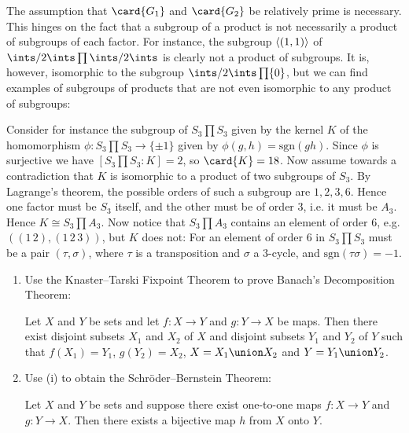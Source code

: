 \documentclass[article, a4paper, 11pt, oneside]{memoir}
\numberwithin{equation}{chapter}
\DeclarePairedDelimiter{\gen}{\langle}{\rangle} %
\renewenvironment{exerciseframed}[1][]{%
    \setsepchar{.}%
    \readlist*\mylist{#1}%
    \def\smalllabel{\mylist[2].\mylist[3]}%
    \refstepcounter{exerciseframed}%
    \begin{exerciseframed*}[#1]%
    \label{ex:#1}%
}{%
    \end{exerciseframed*}%
}
\theoremstyle{nonumberplain}
\newenvironment{displaytheorem}{%
	\begin{displayquote}\itshape%
}{%
	\end{displayquote}%
}
\begin{document}
\newcommand{\sgn}{\mathrm{sgn}}

\begin{remark}
    The assumption that $\card{G_1}$ and $\card{G_2}$ be relatively prime is necessary. This hinges on the fact that a subgroup of a product is not necessarily a product of subgroups of each factor. For instance, the subgroup $\gen{(1,1)}$ of $\ints/2\ints \prod \ints/2\ints$ is clearly not a product of subgroups. It is, however, isomorphic to the subgroup $\ints/2\ints \prod \{0\}$, but we can find examples of subgroups of products that are not even isomorphic to any product of subgroups:

    Consider for instance the subgroup of $S_3 \prod S_3$ given by the kernel $K$ of the homomorphism $\phi \colon S_3 \prod S_3 \to \{\pm 1\}$ given by $\phi(g,h) = \sgn(gh)$. Since $\phi$ is surjective we have $[S_3 \prod S_3 : K] = 2$, so $\card{K} = 18$. Now assume towards a contradiction that $K$ is isomorphic to a product of two subgroups of $S_3$. By Lagrange's theorem, the possible orders of such a subgroup are $1,2,3,6$. Hence one factor must be $S_3$ itself, and the other must be of order $3$, i.e. it must be $A_3$. Hence $K \cong S_3 \prod A_3$. Now notice that $S_3 \prod A_3$ contains an element of order $6$, e.g. $((1\,2), (1\,2\,3))$, but $K$ does not: For an element of order $6$ in $S_3 \prod S_3$ must be a pair $(\tau,\sigma)$, where $\tau$ is a transposition and $\sigma$ a $3$-cycle, and $\sgn(\tau\sigma) = -1$.
\end{remark}


\begin{exerciseframed}[2.32]
    \begin{enumerate}
        \item Use the Knaster--Tarski Fixpoint Theorem to prove Banach's Decomposition Theorem:
        \begin{displaytheorem}
            Let $X$ and $Y$ be sets and let $f \colon X \to Y$ and $g \colon Y \to X$ be maps. Then there exist disjoint subsets $X_1$ and $X_2$ of $X$ and disjoint subsets $Y_1$ and $Y_2$ of $Y$ such that $f(X_1) = Y_1$, $g(Y_2) = X_2$, $X = X_1 \union X_2$ and $Y = Y_1 \union Y_2$.
        \end{displaytheorem}

        \item Use (i) to obtain the Schröder--Bernstein Theorem:
        \begin{displaytheorem}
            Let $X$ and $Y$ be sets and suppose there exist one-to-one maps $f \colon X \to Y$ and $g \colon Y \to X$. Then there exists a bijective map $h$ from $X$ onto $Y$.
        \end{displaytheorem}
    \end{enumerate}
\end{exerciseframed}
\end{document}
